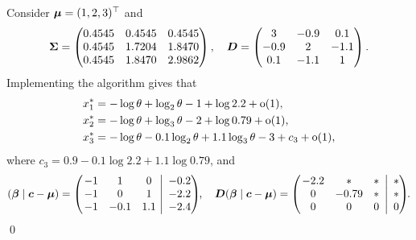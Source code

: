 \begin{example}
Consider $\bm{\mu}=(1,2,3)^\top$ and
\[\bm{\Sigma} = \begin{pmatrix}
            0.4545 & 0.4545 & 0.4545 \\
            0.4545 & 1.7204 & 1.8470 \\
            0.4545 & 1.8470 & 2.9862
        \end{pmatrix}, \quad \bm{D} =\begin{pmatrix}
            3 & -0.9 & 0.1 \\
            -0.9 & 2 & -1.1 \\
            0.1 & -1.1 & 1
        \end{pmatrix} . \]
Implementing the algorithm gives that
\begin{align*}
    x_1^* &= -\log \theta + \log_2 \theta -1 +\log 2.2 + {\mathrm{o}}(1) , \\
    x_2^* &= -\log \theta + \log_3 \theta -2 +\log 0.79 + {\mathrm{o}}(1) , \\
    x_3^* &= -\log \theta -0.1\log_2 \theta + 1.1 \log_3 \theta -3 + c_3 + {\mathrm{o}}(1) ,
\end{align*}
where $c_{3} = 0.9 -0.1 \log 2.2 + 1.1 \log 0.79$, and
\[
(\bm{\beta} \mid \bm{c}-\bm{\mu}) = \left(\left.\begin{matrix}
            -1 & 1 & 0\\
            -1 & 0 & 1\\
            -1 & -0.1 & 1.1
        \end{matrix} ~\right|~
        \begin{matrix}-0.2\\-2.2\\-2.4\end{matrix}\right)\negthickspace ,\quad
    \bm{D} (\bm{\beta} \mid \bm{c}-\bm{\mu}) = \left(\left.\begin{matrix}
            -2.2 & * & *\,\\
            0 & -0.79 & *\,\\
            0 & 0 & 0\,
    \end{matrix} ~\right|~
    \begin{matrix}*\\ *\\0\end{matrix}\right)\negthickspace.
\]
\qed
\end{example}

